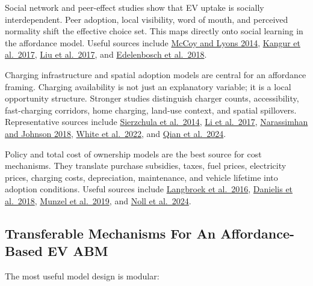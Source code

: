 \documentclass[
]{article}
\begin{document}
Social network and peer-effect studies show that EV uptake is socially
interdependent. Peer adoption, local visibility, word of mouth, and
perceived normality shift the effective choice set. This maps directly
onto social learning in the affordance model. Useful sources include
\href{https://www.sciencedirect.com/science/article/pii/S2214629614000863}{McCoy
and Lyons 2014},
\href{https://research.rug.nl/en/publications/an-agent-based-model-for-diffusion-of-electric-vehicles}{Kangur
et al.~2017},
\href{https://www.sciencedirect.com/science/article/pii/S1361920916301031}{Liu
et al.~2017}, and
\href{https://dspace.library.uu.nl/handle/1874/375563}{Edelenbosch et
al.~2018}.

Charging infrastructure and spatial adoption models are central for an
affordance framing. Charging availability is not just an explanatory
variable; it is a local opportunity structure. Stronger studies
distinguish charger counts, accessibility, fast-charging corridors, home
charging, land-use context, and spatial spillovers. Representative
sources include
\href{https://doi.org/10.1016/j.enpol.2014.01.043}{Sierzchula et
al.~2014}, \href{https://doi.org/10.1086/689702}{Li et al.~2017},
\href{https://doi.org/10.1088/1748-9326/aad0f8}{Narassimhan and Johnson
2018}, \href{https://doi.org/10.1016/j.erss.2022.102663}{White et
al.~2022}, and \href{https://doi.org/10.1016/j.trd.2024.104400}{Qian et
al.~2024}.

Policy and total cost of ownership models are the best source for cost
mechanisms. They translate purchase subsidies, taxes, fuel prices,
electricity prices, charging costs, depreciation, maintenance, and
vehicle lifetime into adoption conditions. Useful sources include
\href{https://doi.org/10.1016/j.enpol.2016.03.050}{Langbroek et
al.~2016}, \href{https://doi.org/10.1016/j.enpol.2018.04.024}{Danielis
et al.~2018}, \href{https://doi.org/10.1016/j.eneco.2019.104493}{Munzel
et al.~2019}, and
\href{https://doi.org/10.1016/j.apenergy.2024.124838}{Noll et al.~2024}.

\subsection{Transferable Mechanisms For An Affordance-Based EV
ABM}\label{transferable-mechanisms-for-an-affordance-based-ev-abm}

The most useful model design is modular:
\end{document}
